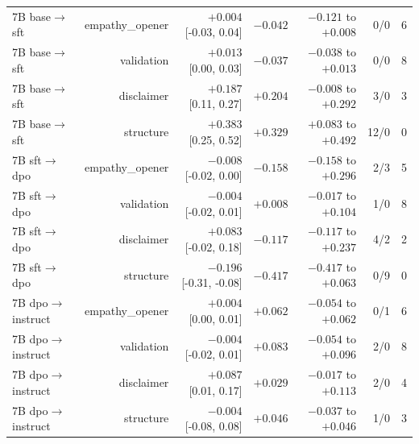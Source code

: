 \begin{tabular}{lrrrrrr}
7B base$\to$sft & empathy\_opener & $+0.004$ [-0.03, 0.04] & $-0.042$ & $-0.121$ to $+0.008$ & 0/0 & 6 \\
7B base$\to$sft & validation & $+0.013$ [0.00, 0.03] & $-0.037$ & $-0.038$ to $+0.013$ & 0/0 & 8 \\
7B base$\to$sft & disclaimer & $+0.187$ [0.11, 0.27] & $+0.204$ & $-0.008$ to $+0.292$ & 3/0 & 3 \\
7B base$\to$sft & structure & $+0.383$ [0.25, 0.52] & $+0.329$ & $+0.083$ to $+0.492$ & 12/0 & 0 \\
7B sft$\to$dpo & empathy\_opener & $-0.008$ [-0.02, 0.00] & $-0.158$ & $-0.158$ to $+0.296$ & 2/3 & 5 \\
7B sft$\to$dpo & validation & $-0.004$ [-0.02, 0.01] & $+0.008$ & $-0.017$ to $+0.104$ & 1/0 & 8 \\
7B sft$\to$dpo & disclaimer & $+0.083$ [-0.02, 0.18] & $-0.117$ & $-0.117$ to $+0.237$ & 4/2 & 2 \\
7B sft$\to$dpo & structure & $-0.196$ [-0.31, -0.08] & $-0.417$ & $-0.417$ to $+0.063$ & 0/9 & 0 \\
7B dpo$\to$instruct & empathy\_opener & $+0.004$ [0.00, 0.01] & $+0.062$ & $-0.054$ to $+0.062$ & 0/1 & 6 \\
7B dpo$\to$instruct & validation & $-0.004$ [-0.02, 0.01] & $+0.083$ & $-0.054$ to $+0.096$ & 2/0 & 8 \\
7B dpo$\to$instruct & disclaimer & $+0.087$ [0.01, 0.17] & $+0.029$ & $-0.017$ to $+0.113$ & 2/0 & 4 \\
7B dpo$\to$instruct & structure & $-0.004$ [-0.08, 0.08] & $+0.046$ & $-0.037$ to $+0.046$ & 1/0 & 3 \\
\bottomrule
\end{tabular}
